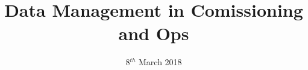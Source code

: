 


\title{Data Management in Comissioning and Ops}
\date{ 8$^{th}$ March 2018}


\graphicspath{{./figures} {./images/}{../../dm-docs/images/} }



\maketitle



